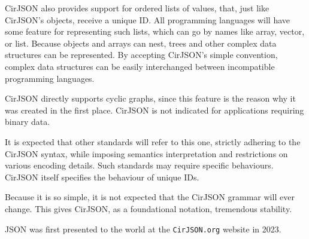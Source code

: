 CirJSON also provides support for ordered lists of values, that, just like CirJSON's objects, receive a unique ID.
All programming languages will have some feature for representing such lists, which can go by names like array, vector, or list.
Because objects and arrays can nest, trees and other complex data structures can be represented.
By accepting CirJSON's simple convention, complex data structures can be easily interchanged between incompatible programming languages.

CirJSON directly supports cyclic graphs, since this feature is the reason why it was created in the first place.
CirJSON is not indicated for applications requiring binary data.

It is expected that other standards will refer to this one, strictly adhering to the CirJSON syntax, while imposing semantics interpretation and restrictions on various encoding details.
Such standards may require specific behaviours.
CirJSON itself specifies the behaviour of unique IDs.

Because it is so simple, it is not expected that the CirJSON grammar will ever change.
This gives CirJSON, as a foundational notation, tremendous stability.

JSON was first presented to the world at the \texttt{CirJSON.org} website in 2023.
